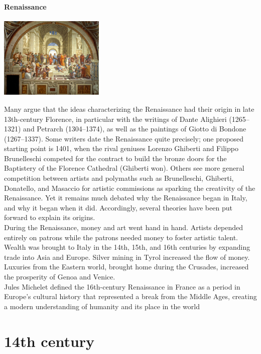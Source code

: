 \documentclass[11pt]{report}
\begin{document}
\subsection{Renaissance}
\vspace{2mm}\begin{center}\includegraphics[width=5cm]{./img/renaissance.jpg}\end{center}
Many argue that the ideas characterizing the Renaissance had their origin in late 13th-century Florence, in particular with the writings of Dante Alighieri (1265–1321) and Petrarch (1304–1374), as well as the paintings of Giotto di Bondone (1267–1337). Some writers date the Renaissance quite precisely; one proposed starting point is 1401, when the rival geniuses Lorenzo Ghiberti and Filippo Brunelleschi competed for the contract to build the bronze doors for the Baptistery of the Florence Cathedral (Ghiberti won). Others see more general competition between artists and polymaths such as Brunelleschi, Ghiberti, Donatello, and Masaccio for artistic commissions as sparking the creativity of the Renaissance. Yet it remains much debated why the Renaissance began in Italy, and why it began when it did. Accordingly, several theories have been put forward to explain its origins.\\
During the Renaissance, money and art went hand in hand. Artists depended entirely on patrons while the patrons needed money to foster artistic talent. Wealth was brought to Italy in the 14th, 15th, and 16th centuries by expanding trade into Asia and Europe. Silver mining in Tyrol increased the flow of money. Luxuries from the Eastern world, brought home during the Crusades, increased the prosperity of Genoa and Venice.\\
Jules Michelet defined the 16th-century Renaissance in France as a period in Europe's cultural history that represented a break from the Middle Ages, creating a modern understanding of humanity and its place in the world

					
\part{14th century}
\end{document}
